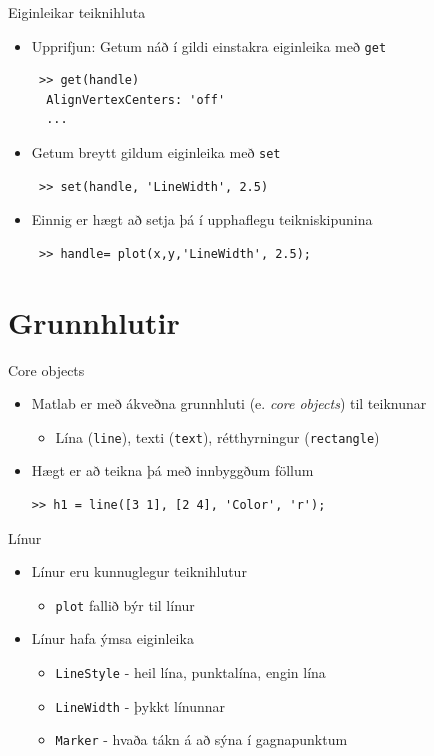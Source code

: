 \documentclass[handout]{beamer}
\begin{document}
\begin{frame}[fragile]{Eiginleikar teiknihluta}
\begin{itemize}
 \item Upprifjun: Getum náð í gildi einstakra eiginleika með \texttt{get}
 \begin{verbatim}
 >> get(handle)
  AlignVertexCenters: 'off'
  ...
 \end{verbatim}
 \item Getum breytt gildum eiginleika með \texttt{set}
 \begin{verbatim}
 >> set(handle, 'LineWidth', 2.5)
 \end{verbatim}
 \item Einnig er hægt að setja þá í upphaflegu teikniskipunina
 \begin{verbatim}
 >> handle= plot(x,y,'LineWidth', 2.5);
 \end{verbatim}
\end{itemize}
\end{frame}

\section{Grunnhlutir}

\begin{frame}[fragile]{Core objects}
\begin{itemize}
 \item Matlab er með ákveðna grunnhluti (e. \emph{core objects}) til teiknunar
 \begin{itemize}
  \item Lína (\texttt{line}), texti (\texttt{text}), rétthyrningur (\texttt{rectangle})
 \end{itemize}
 \item Hægt er að teikna þá með innbyggðum föllum
\begin{verbatim}
>> h1 = line([3 1], [2 4], 'Color', 'r');
\end{verbatim}
\end{itemize}
\end{frame}

\begin{frame}{Línur}
\begin{itemize}
 \item Línur eru kunnuglegur teiknihlutur
 \begin{itemize}
  \item \texttt{plot} fallið býr til línur
 \end{itemize}
 \item Línur hafa ýmsa eiginleika
 \begin{itemize}
  \item \texttt{LineStyle} - heil lína, punktalína, engin lína
  \item \texttt{LineWidth} - þykkt línunnar
  \item \texttt{Marker} - hvaða tákn á að sýna í gagnapunktum
 \end{itemize}
\end{itemize}
\end{frame}
\end{document}
